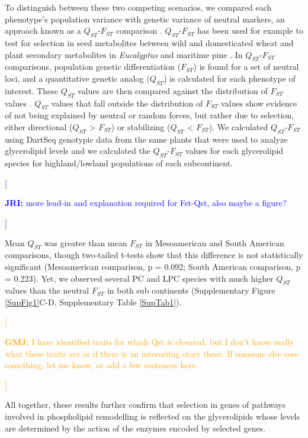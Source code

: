 \documentclass[9pt,twocolumn,twoside,lineno]{gsajnl}
\newcommand{\jri}[1]{\textcolor{blue}{[\begin{tiny}\textbf{JRI:} {#1}\end{tiny}]}}
\newcommand{\gmj}[1]{\textcolor{orange}{[\begin{tiny}\textbf{GMJ:} {#1}\end{tiny}]}}
\begin{document}
To distinguish between these two competing scenarios, we compared each phenotype's population variance with genetic variance of neutral markers, an approach known as a $Q_{ST}$-$F_{ST}$ comparison \citep{Leinonen2013-ic}.
$Q_{ST}$-$F_{ST}$ has been used for example to test for selection in seed metabolites between wild and domesticated wheat \citep{Beleggia2016-xw} and plant secondary metabolites in \textit{Eucalyptus} \citep{o2013chemical} and maritime pine \citep{lopez2019genetic}.
In $Q_{ST}$-$F_{ST}$ comparisons, population genetic differentiation ($F_{ST}$) is found for a set of neutral loci, and a quantitative genetic analog ($Q_{ST}$) is calculated for each phenotype of interest.
These $Q_{ST}$ values are then compared against the distribution of $F_{ST}$ values \citep{whitlock2008evolutionary}.
$Q_{ST}$ values that fall outside the distribution of $F_{ST}$ values show evidence of not being explained by neutral or random forces, but rather due to selection, either directional ($Q_{ST}$ > $F_{ST}$) or stabilizing ($Q_{ST}$ < $F_{ST}$).
We calculated $Q_{ST}$-$F_{ST}$ using DartSeq genotypic data from the same plants that were used to analyze glycerolipid levels and we calculated the $Q_{ST}$-$F_{ST}$ values for each glycerolipid species for highland/lowland populations of each subcontinent.
\jri{more lead-in and explanation required for Fst-Qst, also maybe a figure?}

Mean $Q_{ST}$ was greater than mean $F_{ST}$ in Mesoamerican and South American comparisons, though two-tailed t-tests show that this difference is not statistically significant (Mesoamerican comparison, p = 0.092; South American comparison, p = 0.223).
Yet, we observed several PC and LPC species with much higher $Q_{ST}$ values than the neutral $F_{ST}$ in both sub continents (Supplementary Figure \ref{SupFig1}C-D, Supplementary Table \ref{SupTab1}).
\gmj{I have identified traits for which Qst is elevated, but I don't know really what these traits are or if there is an interesting story there. If someone else sees something, let me know, or add a few sentences here.}
All together, these results further confirm that selection in genes of pathways involved in phospholipid remodelling is reflected on the glycerolipids whose levels are determined by the action of the enzymes encoded by selected genes.
\end{document}
